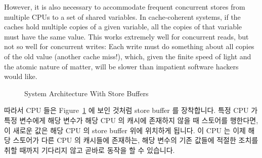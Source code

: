 However, it is also necessary to accommodate frequent concurrent stores
from multiple CPUs to a set of shared variables.
In cache-coherent systems, if the caches hold multiple copies of a given
variable, all the copies of that variable must have the same value.
This works extremely well for concurrent reads, but not so well for
concurrent writes:  Each write must do something about all
copies of the old value (another cache miss!), which, given the finite
speed of light and the atomic nature of matter, will be slower
than impatient software hackers would like.
\fi

\begin{figure}[tb]
\centering
{}
\caption{System Architecture With Store Buffers}
\label{fig:advsync:System Architecture With Store Buffers}
\end{figure}

따라서 CPU 들은
Figure~\ref{fig:advsync:System Architecture With Store Buffers} 에 보인 것처럼
store buffer 를 장착합니다.
특정 CPU 가 특정 변수에게 해당 변수가 해당 CPU 의 캐시에 존재하지 않을 때
스토어를 행한다면, 이 새로운 값은 해당 CPU 의 store buffer 위에 위치하게
됩니다.
이 CPU 는 이제 해당 스토어가 다른 CPU 의 캐시들에 존재하는, 해당 변수의 기존
값들에 적절한 조치를 취할 때까지 기다리지 않고 곧바로 동작을 할 수 있습니다.

